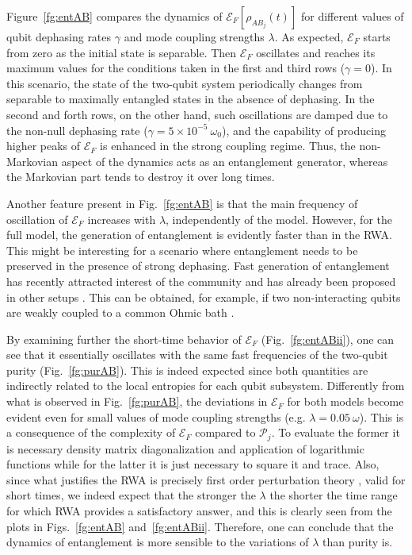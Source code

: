 \documentclass[%
reprint,
amsmath,amssymb,
aps,
pra,
]{revtex4-1}
\begin{document}
Figure~\ref{fg:entAB} compares the dynamics of $\mathcal{E}_F[\rho_{AB_j}(t)]$ for different values of qubit dephasing rates $\gamma$ and mode coupling strengths $\lambda$. As expected, $\mathcal{E}_F$ starts from zero as the initial state is separable. Then $\mathcal{E}_F$ oscillates and reaches its maximum values for the conditions taken in the first and third rows ($\gamma=0$). In this scenario, the state of the two-qubit system periodically changes from separable to maximally entangled states in the absence of dephasing. In the second and forth rows, on the other hand, such oscillations are damped due to the non-null dephasing rate ($\gamma=5\times10^{-5}\ \omega_0$), and the capability of producing higher peaks of $\mathcal{E}_F$ is enhanced in the strong coupling regime. Thus, the non-Markovian aspect of the dynamics acts as an entanglement generator, whereas the Markovian part tends to destroy it over long times. 

Another feature present in Fig.~\ref{fg:entAB} is that the main frequency of oscillation of $\mathcal{E}_F$ increases with $\lambda$, independently of the model. However, for the full model, the generation of entanglement is evidently faster than in the RWA. This might be interesting for a scenario where entanglement needs to be preserved in the presence of strong dephasing. Fast generation of entanglement has recently attracted interest of the community and has already been proposed in other setups \cite{peng12,bel13,qiu13}. This can be obtained, for example, if two non-interacting qubits are weakly coupled to a common Ohmic bath \cite{marz09,marz10}.

By examining further the short-time behavior of $\mathcal{E}_F$ (Fig.~\ref{fg:entABii}), one can see that it essentially oscillates with the same fast frequencies of the two-qubit purity (Fig.~\ref{fg:purAB}). This is indeed expected since both quantities are indirectly related to the local entropies for each qubit subsystem. Differently from what is observed in Fig.~\ref{fg:purAB}, the deviations in $\mathcal{E}_F$ for both models become evident even for small values of mode coupling strengths (e.g. $\lambda=0.05\ \omega$). This is a consequence of the complexity of $\mathcal{E}_F$ compared to $\mathcal{P}_j$. To evaluate the former it is necessary density matrix diagonalization and application of logarithmic functions while for the latter it is just necessary to square it and trace. Also, since what justifies the RWA is precisely first order perturbation theory \cite{boiuna}, valid for short times, we indeed expect that the stronger the $\lambda$ the shorter the time range for which RWA provides a satisfactory answer, and this is clearly seen from the plots in Figs.~\ref{fg:entAB} and~\ref{fg:entABii}. Therefore, one can conclude that the dynamics of entanglement is more sensible to the variations of $\lambda$ than purity is.
\end{document}
